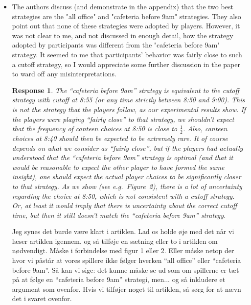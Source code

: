 \documentclass[a4paper]{article}
\newtheorem{response}{Response}
\newenvironment{tobo}{\smallskip \noindent \color{yellow!80!black!80}}{\color{black}\smallskip}
\begin{document}
\begin{itemize}
 \item The authors discuss (and demonstrate in the appendix) that the two best strategies are the "all office" and "cafeteria before 9am" strategies. They also point out that none of these strategies were adopted by players. However, it was not clear to me, and not discussed in enough detail, how the strategy adopted by participants was different from the "cafeteria before 9am" strategy. It seemed to me that participants' behavior was fairly close to such a cutoff strategy, so I would appreciate some further discussion in the paper to ward off any misinterpretations.
 \begin{response}
 The ``cafeteria before 9am'' strategy is equivalent to the cutoff strategy with cutoff at 8:55 (or any time strictly between 8:50 and 9:00). This is not the strategy that the players follow, as our experimental results show. If the players were playing ``fairly close'' to that strategy, we shouldn't expect that the frequency of canteen choices at 8:50 is close to $\frac{1}{2}$. Also, canteen choices at 8:40 should then be expected to be extremely rare. It of course depends on what we consider as ``fairly close'', but if the players had actually understood that the ``cafeteria before 9am'' strategy is optimal (and that it would be reasonable to expect the other player to have formed the same insight), one should expect the actual player choices to be significantly closer to that strategy. As we show (see e.g.~Figure~2), there is a lot of uncertainty regarding the choice at 8:50, which is not consistent with a cutoff strategy. Or, at least it would imply that there is uncertainty about the correct cutoff time, but then it still doesn't match the ``cafeteria before 9am'' strategy.   
 \end{response}
 \begin{tobo}
  Jeg synes det burde være klart i artiklen. Lad os holde øje med det når vi læser artiklen igennem, og så tilføje en sætning eller to i artiklen om nødvendigt. Måske i forbindelse med figur 1 eller 2. Eller måske netop der hvor vi påstår at vores spillere ikke følger hverken ``all office'' eller ``cafeteria before 9am''. Så kan vi sige: det kunne måske se ud som om spillerne er tæt på at følge en ``cafeteria before 9am'' strategi, men... og så inkludere et argument som ovenfor. Hvis vi tilføjer noget til artiklen, så sørg for at nævn det i svaret ovenfor. 
 \end{tobo}
 
\end{itemize}
\end{document}
